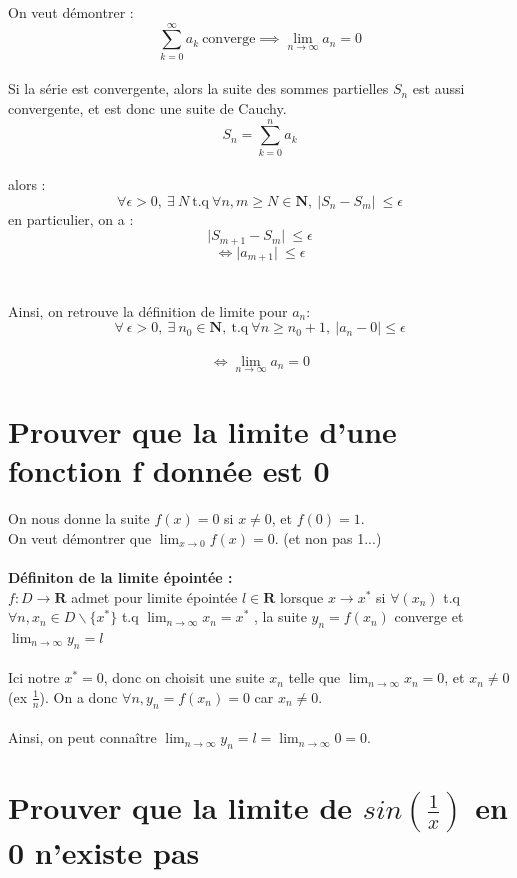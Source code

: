 \documentclass{article}
\begin{document}
On veut démontrer :
\[ \sum_{k=0}^{\infty} a_k\ \text{converge} \implies \lim_{n\to\infty} a_n = 0 \]\\
Si la série est convergente, alors la suite des sommes partielles $ S_n $ est aussi convergente, et est donc une suite de Cauchy.
\[ S_n = \sum_{k=0}^{n} a_k \]\\
alors :
\[ \forall \epsilon > 0,\ \exists\ N\ \text{t.q}\ \forall n, m \geq N \in \mathbf{N},\ \lvert S_n - S_m \lvert\ \leq \epsilon \]
en particulier, on a :
\[ \lvert S_{m+1} - S_m \lvert\ \leq \epsilon \]
\[ \Leftrightarrow \lvert a_{m+1} \lvert\ \leq \epsilon \]\\\\
Ainsi, on retrouve la définition de limite pour $ a_n $:\\
\[ \forall\ \epsilon > 0,\ \exists\ n_0 \in \mathbf{N},\ \text{t.q}\ \forall n \geq n_0 + 1,\ |a_n - 0| \leq \epsilon \]\\
\[ \Leftrightarrow \lim_{n\to\infty} a_n = 0 \]

\newpage

\section{Prouver que la limite d'une fonction f donnée est 0}

On nous donne la suite $ f(x) = 0 $ si $ x \neq 0 $, et $ f(0) = 1 $.\\
On veut démontrer que $ \lim_{x\to{0}} f(x) = 0 $. (et non pas 1...)\\\\
\textbf{Définiton de la limite épointée :}\\
$ f : D \to \mathbf{R} $ admet pour limite épointée $ l \in \mathbf{R} $ lorsque $ x \to x^* $ si $ \forall (x_n) $ t.q $ \forall n, x_n \in D \backslash \{x^*\} $ t.q $ \lim_{n\to\infty} x_n = x^*$ , la suite $ y_n = f(x_n) $ converge et $ \lim_{n\to\infty} y_n = l$\\\\
Ici notre $ x^* = 0 $, donc on choisit une suite $ x_n $ telle que $ \lim_{n\to\infty} x_n = 0$, et $ x_n \neq 0$ (ex $\frac{1}{n}$). On a donc $ \forall n, y_n = f(x_n) = 0 $ car $x_n \neq 0$.\\\\
Ainsi, on peut connaître $ \lim_{n\to\infty} y_n = l = \lim_{n\to\infty} 0 = 0$.

\newpage
\section{Prouver que la limite de $ sin(\frac{1}{x}) $ en 0 n'existe pas}
\end{document}
